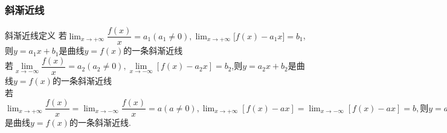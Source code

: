 \documentclass[8pt a4paper, oneside, UTF8]{ctexbook}  %
\begin{document}
\begin{sloppypar}
    \subsubsection{斜渐近线}
        \begin{defn}{斜渐近线定义}{}
            若$\lim_{x\to+\infty}\dfrac{f(x)}{x}=a_{1}(a_{1}\neq0),\lim_{x\to+\infty}\Big[f(x)-a_{1}x\Big]=b_{1}$,则$y=a_{1}x+b_{1}$是曲线$y=f(x)$的一条斜渐近线\\
            若$\lim\limits_{x\to-\infty}\dfrac{f(x)}{x}=a_2(a_2 \neq 0),\lim\limits_{x\to-\infty}\left[f(x)-a_2x\right]=b_2$,则$y=a_2x+b_2$是曲线$y=f(x)$的一条斜渐近线\\
            若$\lim_{x\to+\infty} \dfrac{f(x)}x=\lim_{x\to-\infty}\dfrac{f(x)}x=a(a\neq0),\lim_{x\to+\infty}\left[f(x)-ax\right]=\lim_{x\to-\infty}\left[f(x)-ax\right]=b,则y=ax+b$ 是曲线$y=f(x)$的一条斜渐近线.
        \end{defn}
   
        \ifx\allfiles\undefined
    \end{sloppypar}
\end{document}
